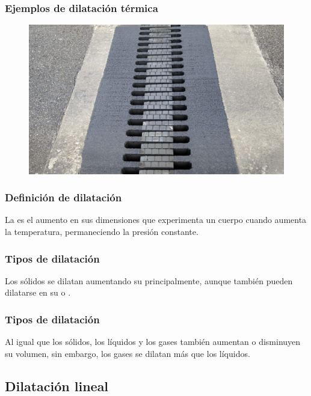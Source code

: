 \documentclass[14pt]{beamer}
\begin{document}
\begin{frame}
\frametitle{Ejemplos de dilatación térmica}
\vspace*{-0.25cm}
\begin{figure}
    \centering
    \includegraphics[scale=0.25]{Imagenes/Dilatacion_02.jpg}
\end{figure}
\end{frame}
\begin{frame}
\frametitle{Definición de dilatación}
La  es el aumento en sus dimensiones que experimenta un cuerpo cuando aumenta la temperatura, permaneciendo la presión constante.
\end{frame}
\begin{frame}
\frametitle{Tipos de dilatación}
Los sólidos se dilatan aumentando su  principalmente, \pause aunque también pueden dilatarse en su  \pause o .
\end{frame}
\begin{frame}
\frametitle{Tipos de dilatación}
Al igual que los sólidos, los líquidos y los gases también aumentan o disminuyen su volumen, sin embargo, los gases se dilatan más que los líquidos.
\end{frame}

\subsection{Dilatación lineal}
\end{document}

